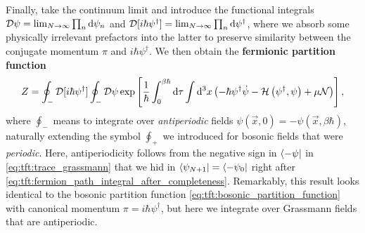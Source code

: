 Finally, take the continuum limit and introduce the functional integrals $\mathcal{D} \psi = \lim_{N \rightarrow \infty} \prod_n \mathop{}\!\mathrm{d} \psi_n$ and $\mathcal{D} [i \hbar \psi^\dagger] = \lim_{N \rightarrow \infty} \prod_n \mathop{}\!\mathrm{d} \psi^\dagger$, where we absorb some physically irrelevant prefactors into the latter to preserve similarity between the conjugate momentum $\pi$ and $i \hbar \psi^\dagger$. 
We then obtain the \textbf{fermionic partition function}
\begin{equation}
	Z = \oint_- \mathcal{D} [i \hbar \psi^\dagger] \oint_- \mathcal{D} \psi \exp \left[ \frac{1}{\hbar} \int_0^{\beta \hbar} \mathop{}\!\mathrm{d} \tau \int \mathop{}\!\mathrm{d}^3 x \left( -\hbar \psi^\dagger \dot{\psi} - \mathcal{H} \left( \psi^\dagger, \psi \right) + \mu \mathcal{N} \right) \right] ,
\label{eq:tft:fermion_partition_function}
\end{equation}
where $\oint_-$ means to integrate over \emph{antiperiodic} fields $\psi(\vec{x}, 0) = -\psi(\vec{x}, \beta \hbar)$, naturally extending the symbol $\oint_+$ we introduced for bosonic fields that were \emph{periodic}.
Here, antiperiodicity follows from the negative sign in $\bra{-\psi}$ in \cref{eq:tft:trace_grassmann} that we hid in $\bra{\psi_{N+1}} = \bra{-\psi_0}$ right after \cref{eq:tft:fermion_path_integral_after_completeness}.
Remarkably, this result looks identical to the bosonic partition function \eqref{eq:tft:bosonic_partition_function} with canonical momentum $\pi = i \hbar \psi^\dagger$, but here we integrate over Grassmann fields that are antiperiodic.

